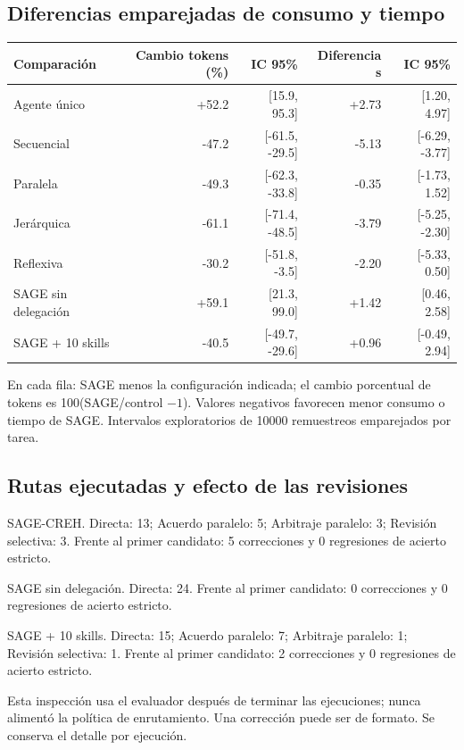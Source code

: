 \subsection{Diferencias emparejadas de consumo y tiempo}

\begin{center}\footnotesize\setlength{\tabcolsep}{3pt}\begin{tabularx}{\linewidth}{@{}Xrrrr@{}}\toprule
Comparación & Cambio tokens (\%) & IC 95\% & Diferencia s & IC 95\% \\ \midrule
Agente único & +52.2 & [15.9, 95.3] & +2.73 & [1.20, 4.97] \\
Secuencial & -47.2 & [-61.5, -29.5] & -5.13 & [-6.29, -3.77] \\
Paralela & -49.3 & [-62.3, -33.8] & -0.35 & [-1.73, 1.52] \\
Jerárquica & -61.1 & [-71.4, -48.5] & -3.79 & [-5.25, -2.30] \\
Reflexiva & -30.2 & [-51.8, -3.5] & -2.20 & [-5.33, 0.50] \\
SAGE sin delegación & +59.1 & [21.3, 99.0] & +1.42 & [0.46, 2.58] \\
SAGE + 10 skills & -40.5 & [-49.7, -29.6] & +0.96 & [-0.49, 2.94] \\
\bottomrule\end{tabularx}\end{center}

En cada fila: SAGE menos la configuración indicada; el cambio porcentual de tokens es 100(SAGE/control $-1$). Valores negativos favorecen menor consumo o tiempo de SAGE. Intervalos exploratorios de 10000 remuestreos emparejados por tarea.

\subsection{Rutas ejecutadas y efecto de las revisiones}

SAGE-CREH. Directa: 13; Acuerdo paralelo: 5; Arbitraje paralelo: 3; Revisión selectiva: 3. Frente al primer candidato: 5 correcciones y 0 regresiones de acierto estricto.

SAGE sin delegación. Directa: 24. Frente al primer candidato: 0 correcciones y 0 regresiones de acierto estricto.

SAGE + 10 skills. Directa: 15; Acuerdo paralelo: 7; Arbitraje paralelo: 1; Revisión selectiva: 1. Frente al primer candidato: 2 correcciones y 0 regresiones de acierto estricto.

Esta inspección usa el evaluador después de terminar las ejecuciones; nunca alimentó la política de enrutamiento. Una corrección puede ser de formato. Se conserva el detalle por ejecución.

